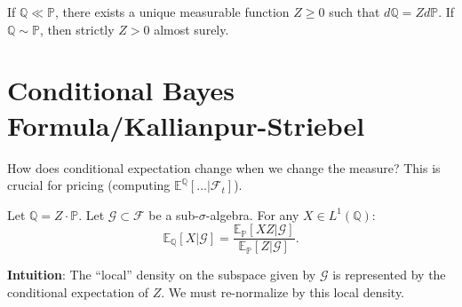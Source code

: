 \begin{theorem}
If $\mathbb{Q} \ll \mathbb{P}$, there exists a unique measurable function $Z \geq 0$ such that $d\mathbb{Q} = Z d\mathbb{P}$.
If $\mathbb{Q} \sim \mathbb{P}$, then strictly $Z > 0$ almost surely.
\end{theorem}

\section{Conditional Bayes Formula/Kallianpur-Striebel}
How does conditional expectation change when we change the measure? This is crucial for pricing (computing $\mathbb{E}^{\mathbb{Q}}[ \dots | \mathcal{F}_t ]$).

\begin{theorem}
Let $\mathbb{Q} = Z \cdot \mathbb{P}$. Let $\mathcal{G} \subset \mathcal{F}$ be a sub-$\sigma$-algebra. For any $X \in L^1(\mathbb{Q})$:
\[
\mathbb{E}_{\mathbb{Q}}[X | \mathcal{G}] = \frac{\mathbb{E}_{\mathbb{P}}[X Z | \mathcal{G}]}{\mathbb{E}_{\mathbb{P}}[Z | \mathcal{G}]}.
\]
\end{theorem}
\textbf{Intuition}: The ``local'' density on the subspace given by $\mathcal{G}$ is represented by the conditional expectation of $Z$. We must re-normalize by this local density.
